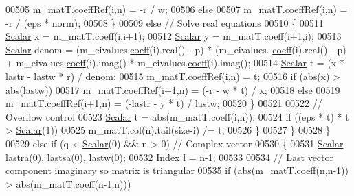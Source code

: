 \begin{DoxyCode}
00505               m\_matT.coeffRef(i,n) = -r / w;
00506             \textcolor{keywordflow}{else}
00507               m\_matT.coeffRef(i,n) = -r / (eps * norm);
00508           \}
00509           \textcolor{keywordflow}{else} \textcolor{comment}{// Solve real equations}
00510           \{
00511             \hyperlink{group___eigenvalues___module_a017d49fe0d59874b70a2fcf35e5aa373}{Scalar} x = m\_matT.coeff(i,i+1);
00512             \hyperlink{group___eigenvalues___module_a017d49fe0d59874b70a2fcf35e5aa373}{Scalar} y = m\_matT.coeff(i+1,i);
00513             \hyperlink{group___eigenvalues___module_a017d49fe0d59874b70a2fcf35e5aa373}{Scalar} denom = (m\_eivalues.\hyperlink{class_eigen_1_1_plain_object_base_afbfc12954f16d21aedb7bd839f64a278}{coeff}(i).real() - p) * (m\_eivalues.
      \hyperlink{class_eigen_1_1_plain_object_base_afbfc12954f16d21aedb7bd839f64a278}{coeff}(i).real() - p) + m\_eivalues.\hyperlink{class_eigen_1_1_plain_object_base_afbfc12954f16d21aedb7bd839f64a278}{coeff}(i).imag() * m\_eivalues.\hyperlink{class_eigen_1_1_plain_object_base_afbfc12954f16d21aedb7bd839f64a278}{coeff}(i).imag();
00514             \hyperlink{group___eigenvalues___module_a017d49fe0d59874b70a2fcf35e5aa373}{Scalar} t = (x * lastr - lastw * r) / denom;
00515             m\_matT.coeffRef(i,n) = t;
00516             \textcolor{keywordflow}{if} (abs(x) > abs(lastw))
00517               m\_matT.coeffRef(i+1,n) = (-r - w * t) / x;
00518             \textcolor{keywordflow}{else}
00519               m\_matT.coeffRef(i+1,n) = (-lastr - y * t) / lastw;
00520           \}
00521 
00522           \textcolor{comment}{// Overflow control}
00523           \hyperlink{group___eigenvalues___module_a017d49fe0d59874b70a2fcf35e5aa373}{Scalar} t = abs(m\_matT.coeff(i,n));
00524           \textcolor{keywordflow}{if} ((eps * t) * t > \hyperlink{group___eigenvalues___module_a017d49fe0d59874b70a2fcf35e5aa373}{Scalar}(1))
00525             m\_matT.col(n).tail(size-i) /= t;
00526         \}
00527       \}
00528     \}
00529     \textcolor{keywordflow}{else} \textcolor{keywordflow}{if} (q < \hyperlink{group___eigenvalues___module_a017d49fe0d59874b70a2fcf35e5aa373}{Scalar}(0) && n > 0) \textcolor{comment}{// Complex vector}
00530     \{
00531       \hyperlink{group___eigenvalues___module_a017d49fe0d59874b70a2fcf35e5aa373}{Scalar} lastra(0), lastsa(0), lastw(0);
00532       \hyperlink{group___eigenvalues___module_a5bff6a6bc0efac67d52c60c2c3deb9ee}{Index} l = n-1;
00533 
00534       \textcolor{comment}{// Last vector component imaginary so matrix is triangular}
00535       \textcolor{keywordflow}{if} (abs(m\_matT.coeff(n,n-1)) > abs(m\_matT.coeff(n-1,n)))

\end{DoxyCode}
